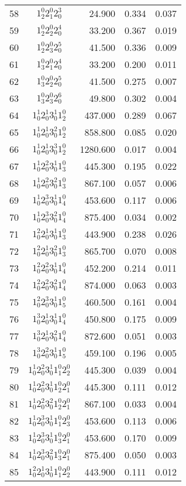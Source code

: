 \documentclass[12pt]{article}
\begin{document}
\begin{table}
\begin{tabular}{rcrrr}
58&$1_2^0 2_1^0 2_0^3$& 24.900& 0.334& 0.037\\
59&$1_2^0 2_2^0 2_0^4$& 33.200& 0.367& 0.019\\
60&$1_2^0 2_3^0 2_0^5$& 41.500& 0.336& 0.009\\
61&$1_3^0 2_1^0 2_0^4$& 33.200& 0.200& 0.011\\
62&$1_3^0 2_2^0 2_0^5$& 41.500& 0.275& 0.007\\
63&$1_3^0 2_3^0 2_0^6$& 49.800& 0.302& 0.004\\
64&$1_0^1 2_0^1 3_0^1 1_2^0$& 437.000& 0.289& 0.067\\
65&$1_0^1 2_0^1 3_0^2 1_2^0$& 858.800& 0.085& 0.020\\
66&$1_0^1 2_0^1 3_0^3 1_2^0$& 1280.600& 0.017& 0.004\\
67&$1_0^1 2_0^2 3_0^1 1_3^0$& 445.300& 0.195& 0.022\\
68&$1_0^1 2_0^2 3_0^2 1_3^0$& 867.100& 0.057& 0.006\\
69&$1_0^1 2_0^3 3_0^1 1_4^0$& 453.600& 0.117& 0.006\\
70&$1_0^1 2_0^3 3_0^2 1_4^0$& 875.400& 0.034& 0.002\\
71&$1_0^2 2_0^1 3_0^1 1_3^0$& 443.900& 0.238& 0.026\\
72&$1_0^2 2_0^1 3_0^2 1_3^0$& 865.700& 0.070& 0.008\\
73&$1_0^2 2_0^2 3_0^1 1_4^0$& 452.200& 0.214& 0.011\\
74&$1_0^2 2_0^2 3_0^2 1_4^0$& 874.000& 0.063& 0.003\\
75&$1_0^2 2_0^3 3_0^1 1_5^0$& 460.500& 0.161& 0.004\\
76&$1_0^3 2_0^1 3_0^1 1_4^0$& 450.800& 0.175& 0.009\\
77&$1_0^3 2_0^1 3_0^2 1_4^0$& 872.600& 0.051& 0.003\\
78&$1_0^3 2_0^2 3_0^1 1_5^0$& 459.100& 0.196& 0.005\\
79&$1_0^1 2_0^2 3_0^1 1_1^0 2_2^0$& 445.300& 0.039& 0.004\\
80&$1_0^1 2_0^2 3_0^1 1_2^0 2_1^0$& 445.300& 0.111& 0.012\\
81&$1_0^1 2_0^2 3_0^2 1_2^0 2_1^0$& 867.100& 0.033& 0.004\\
82&$1_0^1 2_0^3 3_0^1 1_1^0 2_3^0$& 453.600& 0.113& 0.006\\
83&$1_0^1 2_0^3 3_0^1 1_3^0 2_1^0$& 453.600& 0.170& 0.009\\
84&$1_0^1 2_0^3 3_0^2 1_3^0 2_1^0$& 875.400& 0.050& 0.003\\
85&$1_0^2 2_0^1 3_0^1 1_1^0 2_2^0$& 443.900& 0.111& 0.012\\

\end{tabular}
\end{table}
\end{document}
